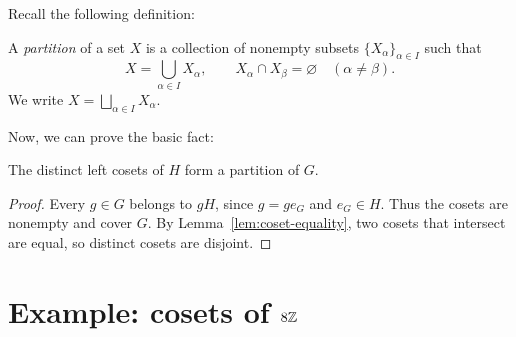 \documentclass[reqno,11pt]{amsart}
\begin{document}
Recall the following definition: 

\begin{define}[Partition]
	A \emph{partition} of a set $X$ is a collection of nonempty subsets
	$\{X_\alpha\}_{\alpha\in I}$ such that
	\[
	X=\bigcup_{\alpha\in I}X_\alpha,
	\qquad X_\alpha\cap X_\beta=\varnothing\quad(\alpha\neq\beta).
	\]
	We write $X=\bigsqcup_{\alpha\in I}X_\alpha$.
\end{define}

Now, we can prove the basic fact: 

\begin{proposition}
	The distinct left cosets of $H$ form a partition of $G$.
\end{proposition}
\begin{proof}
	Every $g\in G$ belongs to $gH$, since $g=ge_G$ and $e_G\in H$.
	Thus the cosets are nonempty and cover $G$. By
	Lemma~\ref{lem:coset-equality}, two cosets that intersect are equal, so
	distinct cosets are disjoint.
\end{proof}



\section{Example: cosets of \texorpdfstring{$8\mathbb{Z}$}{8Z}}\label{sec:8Z}
\end{document}
